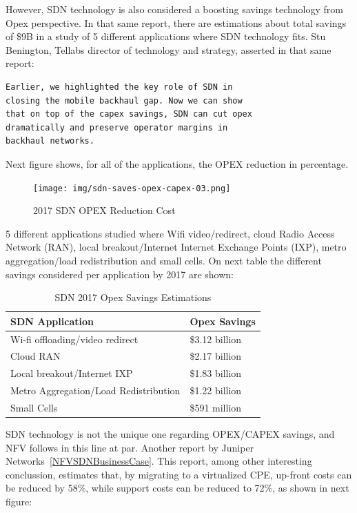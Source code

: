 \documentclass[a4paper, 12pt]{book}
\begin{document}
However, SDN technology is also considered a boosting savings technology from Opex perspective. In that same report, there are estimations about total savings of \$9B in a study of 5 different applications where SDN technology fits. Stu Benington, Tellabs director of technology and strategy, asserted in that same report:
\begin{verbatim}
Earlier, we highlighted the key role of SDN in
closing the mobile backhaul gap. Now we can show
that on top of the capex savings, SDN can cut opex
dramatically and preserve operator margins in
backhaul networks.
\end{verbatim}
Next figure shows, for all of the applications, the OPEX reduction in percentage.
\begin{center}
 \begin{figure}[H]
 \begin{center}
   \texttt{[image: img/sdn-saves-opex-capex-03.png]}
   \caption{2017 SDN OPEX Reduction Cost}
   \label{fig:sdnopexreduction}
 \end{center}
 \end{figure}
\end{center}
5 different applications studied where Wifi video/redirect, cloud Radio Access Network (RAN), local breakout/Internet Internet Exchange Points (IXP), metro aggregation/load redistribution and small cells. On next table the different savings considered per application by 2017 are shown:
\begin{table}[H]
\footnotesize
\begin{center}
\begin{tabular}{|l|l|}
\hline
\textbf{SDN Application} & \textbf{Opex Savings} \\ \hline
Wi-fi offloading/video redirect & \$3.12 billion \\ \hline
Cloud RAN & \$2.17 billion \\ \hline
Local breakout/Internet IXP &	\$1.83 billion  \\ \hline
Metro Aggregation/Load Redistribution & \$1.22 billion  \\ \hline
Small Cells & \$591 million  \\ \hline
\end{tabular}
\end{center}
\caption{SDN 2017 Opex Savings Estimations}
\label{tab:2017sdnopexsavings}
\end{table}
SDN technology is not the unique one regarding OPEX/CAPEX savings, and NFV follows in this line at par. Another report by Juniper Networks~\ref{NFVSDNBusinessCase}. This report, among other interesting conclussion, estimates that, by migrating to a virtualized CPE, up-front costs can be reduced by 58\%, while support costs can be reduced to 72\%, as shown in next figure:
\end{document}
